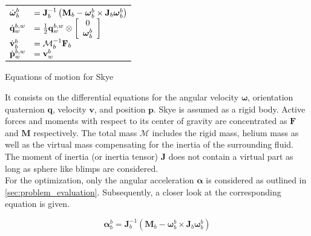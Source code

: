 \begin{table}[htb!]
\centering
$\begin{array}{ll}
\toprule
\dot{\boldsymbol{\omega}}_b^b &= \mathbf{J}_b^{-1} \left( \mathbf{M}_b  - \boldsymbol{\omega}_b^b \times \mathbf{J}_b \boldsymbol{\omega}_b^b \right) \\

\dot{\mathbf{q}}_w^{b,w} &= \frac{1}{2} \mathbf{q}_w^{b,w} \otimes \left[
\begin{array}{c}
	0 \\ \boldsymbol{\omega}_b^b
\end{array} \right] \\

\dot{\mathbf{v}}_b^b &= \mathbf{\mathcal{M}}_b^{-1} \mathbf{F}_b \\

\dot{\mathbf{p}}_w^{b,w} &= \mathbf{v}_w^b \\

\bottomrule
\end{array}$
\caption{Equations of motion for Skye}
\label{tab:sys_mod}
\end{table}

It consists on the differential equations for the angular velocity $\boldsymbol{\omega}$, orientation quaternion $\mathbf{q}$, velocity $\mathbf{v}$, and position $\mathbf{p}$.
Skye is assumed as a rigid body.
Active forces and moments with respect to its center of gravity are concentrated as $\mathbf{F}$ and $\mathbf{M}$ respectively.
The total mass $\mathbf{\mathcal{M}}$ includes the rigid mass, helium mass as well as the virtual mass compensating for the inertia of the surrounding fluid.
The moment of inertia (or inertia tensor) $\mathbf{J}$ does not contain a virtual part as long as sphere like blimps are considered.
\\
For the optimization, only the angular acceleration $\boldsymbol{\alpha}$ is considered as outlined in \cref{sec:problem_evaluation}.
Subsequently, a closer look at the corresponding equation is given.

\begin{equation}
\label{eq:angular_accel}
\boldsymbol{\alpha}_b^b = \mathbf{J}_b^{-1} \left( \mathbf{M}_b  - \boldsymbol{\omega}_b^b \times \mathbf{J}_b \boldsymbol{\omega}_b^b \right)
\end{equation}

